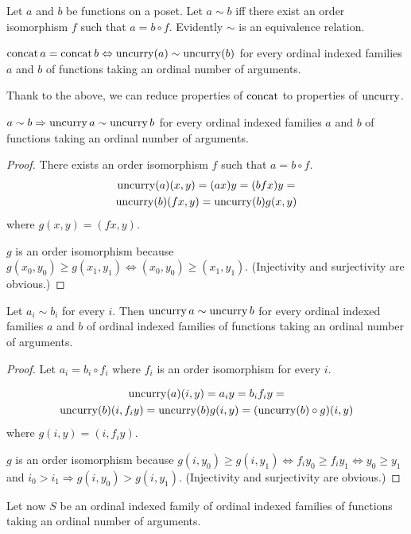 Let $a$ and $b$ be functions on a poset. Let $a\sim b$ iff there
exist an order isomorphism $f$ such that $a=b\circ f$. Evidently
$\sim$ is an equivalence relation.
\begin{obvious}
$\operatorname{concat} a=\operatorname{concat} b\Leftrightarrow\operatorname{uncurry}(a)\sim\operatorname{uncurry}(b)$ for
every ordinal indexed families $a$ and $b$ of functions taking an
ordinal number of arguments.
\end{obvious}
Thank to the above, we can reduce properties of $\operatorname{concat}$ to properties
of $\operatorname{uncurry}$.
\begin{lem}
$a\sim b\Rightarrow\operatorname{uncurry} a\sim\operatorname{uncurry} b$ for every ordinal indexed
families $a$ and $b$ of functions taking an ordinal number of arguments.\end{lem}
\begin{proof}
There exists an order isomorphism $f$ such that $a=b\circ f$.
\begin{multline*}
\operatorname{uncurry}(a)(x,y)=(ax)y=(bfx)y=\\\operatorname{uncurry}(b)(fx,y)=\operatorname{uncurry}(b)g(x,y)
\end{multline*}
where $g(x,y)=(fx,y)$.

$g$ is an order isomorphism because $g(x_{0},y_{0})\ge g(x_{1},y_{1})\Leftrightarrow(x_{0},y_{0})\ge(x_{1},y_{1})$.
(Injectivity and surjectivity are obvious.)\end{proof}
\begin{lem}
\label{by-member}Let $a_{i}\sim b_{i}$ for every $i$. Then $\operatorname{uncurry} a\sim\operatorname{uncurry} b$
for every ordinal indexed families $a$ and $b$ of ordinal indexed
families of functions taking an ordinal number of arguments.\end{lem}
\begin{proof}
Let $a_{i}=b_{i}\circ f_{i}$ where $f_{i}$ is an order isomorphism
for every $i$.

\begin{multline*}
\operatorname{uncurry}(a)(i,y)=a_{i}y=b_{i}f_{i}y=\\\operatorname{uncurry}(b)(i,f_{i}y)=\operatorname{uncurry}(b)g(i,y)=(\operatorname{uncurry}(b)\circ g)(i,y)\end{multline*}
where $g(i,y)=(i,f_{i}y)$.

$g$ is an order isomorphism because $g(i,y_{0})\ge g(i,y_{1})\Leftrightarrow f_{i}y_{0}\ge f_{i}y_{1}\Leftrightarrow y_{0}\ge y_{1}$
and $i_{0}>i_{1}\Rightarrow g(i,y_{0})>g(i,y_{1})$. (Injectivity
and surjectivity are obvious.)
\end{proof}
Let now $S$ be an ordinal indexed family of ordinal indexed families
of functions taking an ordinal number of arguments.
